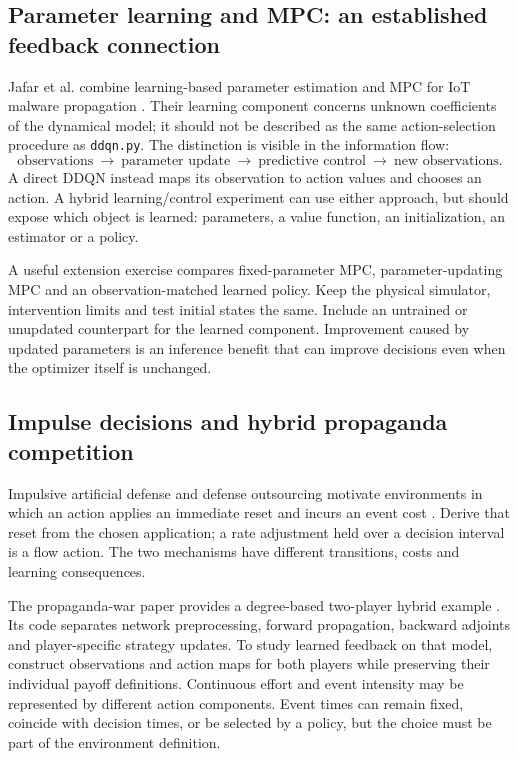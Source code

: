 \documentclass[11pt,a4paper]{article}
\theoremstyle{definition}
\theoremstyle{remark}
\begin{document}
\subsection{Parameter learning and MPC: an established feedback connection}
Jafar et al. combine learning-based parameter estimation and MPC for IoT malware propagation \cite{feedback2024}. Their learning component concerns unknown coefficients of the dynamical model; it should not be described as the same action-selection procedure as \texttt{ddqn.py}. The distinction is visible in the information flow:
\[
\text{observations}\ \longrightarrow\ \text{parameter update}\
\longrightarrow\ \text{predictive control}\ \longrightarrow\ \text{new observations}.
\]
A direct DDQN instead maps its observation to action values and chooses an action. A hybrid learning/control experiment can use either approach, but should expose which object is learned: parameters, a value function, an initialization, an estimator or a policy.

A useful extension exercise compares fixed-parameter MPC, parameter-updating MPC and an observation-matched learned policy. Keep the physical simulator, intervention limits and test initial states the same. Include an untrained or unupdated counterpart for the learned component. Improvement caused by updated parameters is an inference benefit that can improve decisions even when the optimizer itself is unchanged.

\subsection{Impulse decisions and hybrid propaganda competition}
Impulsive artificial defense and defense outsourcing motivate environments in which an action applies an immediate reset and incurs an event cost \cite{impulse2023,outsource2024}. Derive that reset from the chosen application; a rate adjustment held over a decision interval is a flow action. The two mechanisms have different transitions, costs and learning consequences.

The propaganda-war paper provides a degree-based two-player hybrid example \cite{war2024}. Its code separates network preprocessing, forward propagation, backward adjoints and player-specific strategy updates. To study learned feedback on that model, construct observations and action maps for both players while preserving their individual payoff definitions. Continuous effort and event intensity may be represented by different action components. Event times can remain fixed, coincide with decision times, or be selected by a policy, but the choice must be part of the environment definition.
\end{document}
